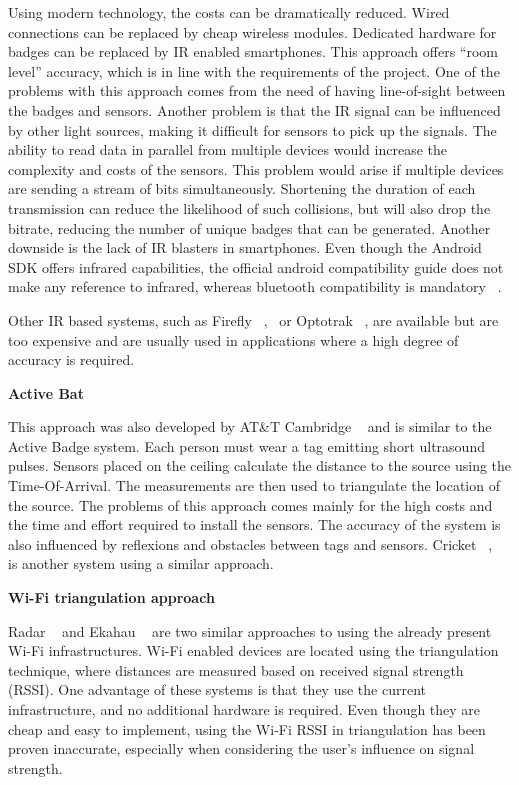Using modern technology, the costs can be dramatically reduced. Wired connections can be replaced by cheap wireless modules. Dedicated hardware for badges can be replaced by IR enabled smartphones. This approach offers “room level” accuracy, which is in line with the requirements of the project. One of the problems with this approach comes from the need of having line-of-sight between the badges and sensors. Another problem is that the IR signal can be influenced by other light sources, making it difficult for sensors to pick up the signals. The ability to read data in parallel from multiple devices would increase the complexity and costs of the sensors. This problem would arise if multiple devices are sending a stream of bits simultaneously. Shortening the duration of each transmission can reduce the likelihood of such collisions, but will also drop the bitrate, reducing the number of unique badges that can be generated. Another downside is the lack of IR blasters in smartphones. Even though the Android SDK offers infrared capabilities, the official android compatibility guide does not make any reference to infrared, whereas bluetooth compatibility is mandatory ~\cite{AndroidCompat}.

Other IR based systems, such as Firefly ~\cite{Firefly1},~\cite{Firefly2} or Optotrak ~\cite{Optotrak}, are available but are too expensive and are usually used in applications where a high degree of accuracy is required. 

\medskip
\noindent \textbf{Active Bat}

This approach was also developed by AT\&T Cambridge ~\cite{ActiveBat} and is similar to the Active Badge system. Each person must wear a tag emitting short ultrasound pulses. Sensors placed on the ceiling calculate the distance to the source using the Time-Of-Arrival. The measurements are then used to triangulate the location of the source. The problems of this approach comes mainly for the high costs and the time and effort required to install the sensors. The accuracy of the system is also influenced by reflexions and obstacles between tags and sensors. Cricket ~\cite{Priyantha1}, ~\cite{Priyantha2} is another system using a similar approach.

\medskip
\noindent \textbf{Wi-Fi triangulation approach}

Radar ~\cite{Bahl} and Ekahau ~\cite{Ekahau} are two similar approaches to using the already present Wi-Fi infrastructures. Wi-Fi enabled devices are located using the triangulation technique, where distances are measured based on received signal strength (RSSI). One advantage of these systems is that they use the current infrastructure, and no additional hardware is required. Even though they are cheap and easy to implement, using the Wi-Fi RSSI in triangulation has been proven inaccurate, especially when considering the user’s influence on signal strength. 

